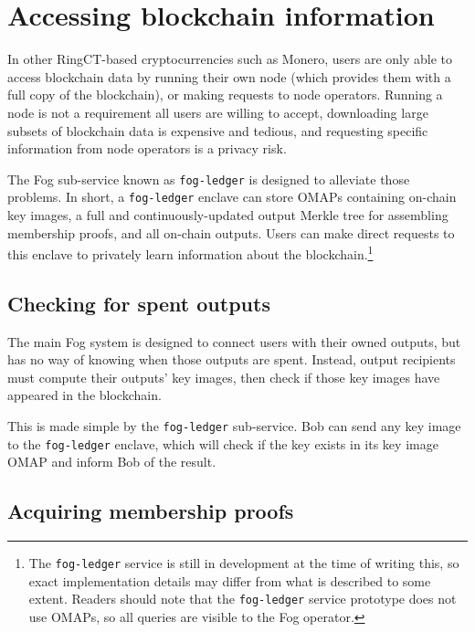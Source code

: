 \section{Accessing blockchain information}
\label{sec:fog-accessing-blockchain-information}

In other RingCT-based cryptocurrencies such as Monero, users are only able to access blockchain data by running their own node (which provides them with a full copy of the blockchain), or making requests to node operators. Running a node is not a requirement all users are willing to accept, downloading large subsets of blockchain data is expensive and tedious, and requesting specific information from node operators is a privacy risk.

The Fog sub-service known as {\tt fog-ledger} is designed to alleviate those problems. In short, a {\tt fog-ledger} enclave can store OMAPs containing on-chain key images, a full and continuously-updated output Merkle tree for assembling membership proofs, and all on-chain outputs. Users can make direct requests to this enclave to privately learn information about the blockchain.\footnote{The {\tt fog-ledger} service is still in development at the time of writing this, so exact implementation details may differ from what is described to some extent. Readers should note that the {\tt fog-ledger} service prototype does not use OMAPs, so all queries are visible to the Fog operator.}


\subsection{Checking for spent outputs}
\label{subsec:fog-checking-spent-outputs}

The main Fog system is designed to connect users with their owned outputs, but has no way of knowing when those outputs are spent. Instead, output recipients must compute their outputs' key images, then check if those key images have appeared in the blockchain.

This is made simple by the {\tt fog-ledger} sub-service. Bob can send any key image to the {\tt fog-ledger} enclave, which will check if the key exists in its key image OMAP and inform Bob of the result.


\subsection{Acquiring membership proofs}
\label{subsec:fog-acquiring-membership-proofs}

